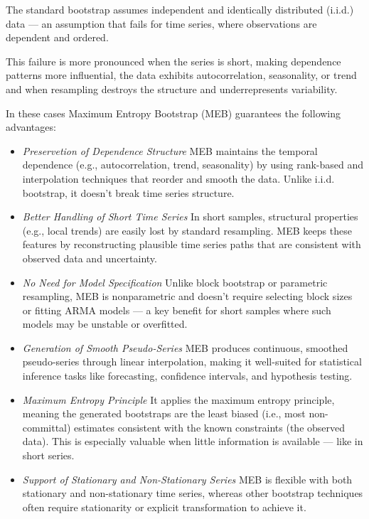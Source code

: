 \documentclass[ijoc,sglanonrev]{informs4}
\begin{document}

The standard bootstrap assumes independent and identically distributed (i.i.d.) data — an assumption that fails for time series, where observations are dependent and ordered.

This failure is more pronounced when the series is short, making dependence patterns more influential, the data exhibits autocorrelation, seasonality, or trend and when resampling destroys the structure and underrepresents variability.

In these cases Maximum Entropy Bootstrap (MEB) guarantees the following advantages:

\begin{itemize}
    \item {\it Preservetion of Dependence Structure } MEB maintains the temporal dependence (e.g., autocorrelation, trend, seasonality) by using rank-based and interpolation techniques that reorder and smooth the data. Unlike i.i.d. bootstrap, it doesn’t break time series structure.

    \item {\it Better Handling of Short Time Series } In short samples, structural properties (e.g., local trends) are easily lost by standard resampling. MEB keeps these features by reconstructing plausible time series paths that are consistent with observed data and uncertainty.

    \item {\it No Need for Model Specification} Unlike block bootstrap or parametric resampling, MEB is nonparametric and doesn’t require selecting block sizes or fitting ARMA models — a key benefit for short samples where such models may be unstable or overfitted.

    \item {\it Generation of Smooth Pseudo-Series} MEB produces continuous, smoothed pseudo-series through linear interpolation, making it well-suited for statistical inference tasks like forecasting, confidence intervals, and hypothesis testing.

    \item {\it Maximum Entropy Principle} It applies the maximum entropy principle, meaning the generated bootstraps are the least biased (i.e., most non-committal) estimates consistent with the known constraints (the observed data). This is especially valuable when little information is available — like in short series.

    \item {\it Support of Stationary and Non-Stationary Series} MEB is flexible with both stationary and non-stationary time series, whereas other bootstrap techniques often require stationarity or explicit transformation to achieve it.
\end{itemize}
\end{document}
